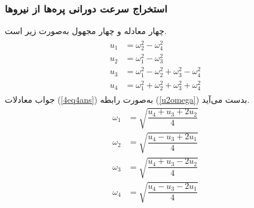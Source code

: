 \subsubsection{استخراج سرعت دورانی پره‌ها از نیروها}
چهار معادله و چهار مجهول به‌صورت زیر است.
\begin{align}\label{4eq4ans}
	\begin{split}
		u_1 &= \omega_2^2 - \omega_4^2\\
		u_2 &= \omega_1^2 - \omega_3^2\\
		u_3 &= \omega_1^2 - \omega_2^2  + \omega_3^2 - \omega_4^2\\
		u_4 &= \omega_1^2 + \omega_2^2  + \omega_3^2 + \omega_4^2
	\end{split}
\end{align}
جواب معادلات 
(\ref{4eq4ans})
به‌صورت رابطه 
(\ref{u2omega})
بدست می‌آید.
\begin{equation}\label{u2omega}
	\begin{split}
		\omega_1 &= \sqrt{\dfrac{u_4 + u_3 +2u_2}{4}}\\[1em]
		\omega_2 &= \sqrt{\dfrac{u_4 - u_3 +2u_1}{4}}\\[1em]
		\omega_3 &= \sqrt{\dfrac{u_4 + u_3 -2u_2}{4}}\\[1em]
		\omega_4 &= \sqrt{\dfrac{u_4 - u_3 -2u_1}{4}}
	\end{split}
\end{equation}

